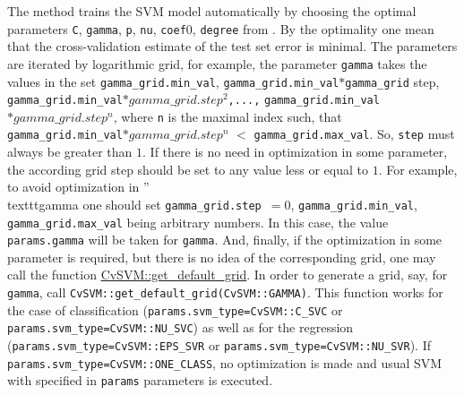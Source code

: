 \begin{description}
\end{description}

The method trains the SVM model automatically by choosing the optimal parameters \texttt{C}, \texttt{gamma}, \texttt{p}, \texttt{nu}, \texttt{coef$0$}, \texttt{degree} from . By the optimality one mean that the cross-validation estimate of the test set error is minimal. The parameters are iterated by logarithmic grid, for example, the parameter \texttt{gamma} takes the values in the set {\texttt{gamma\_grid.min\_val}, \texttt{gamma\_grid.min\_val$*$gamma\_grid} step, \texttt{gamma\_grid.min\_val$*gamma\_grid.step^2$,...,} \texttt{gamma\_grid.min\_val$*gamma\_grid.step^n$}}, where \texttt{n} is the maximal index such, that \texttt{gamma\_grid.min\_val$*gamma\_grid.step^n$} $<$ \texttt{gamma\_grid.max\_val}. So, \texttt{step} must always be greater than $1$.
\newline
\newline
If there is no need in optimization in some parameter, the according grid step should be set to any value less or equal to $1$. For example, to avoid optimization in ''\\texttt{gamma} one should set \texttt{gamma\_grid.step $= 0$}, \texttt{gamma\_grid.min\_val}, \texttt{gamma\_grid.max\_val} being arbitrary numbers. In this case, the value \texttt{params.gamma} will be taken for \texttt{gamma}.
\newline
\newline
And, finally, if the optimization in some parameter is required, but there is no idea of the corresponding grid, one may call the function \href{#CvSVM.3A.3Agetdefaultgrid}{CvSVM::get\_default\_grid}. In order to generate a grid, say, for \texttt{gamma}, call \texttt{CvSVM::get\_default\_grid(CvSVM::GAMMA)}.
\newline
\newline
This function works for the case of classification (\texttt{params.svm\_type=CvSVM::C\_SVC} or \texttt{params.svm\_type=CvSVM::NU\_SVC}) as well as for the regression (\texttt{params.svm\_type=CvSVM::EPS\_SVR} or \texttt{params.svm\_type=CvSVM::NU\_SVR}). If \texttt{params.svm\_type=CvSVM::ONE\_CLASS}, no optimization is made and usual SVM with specified in \texttt{params} parameters is executed.


